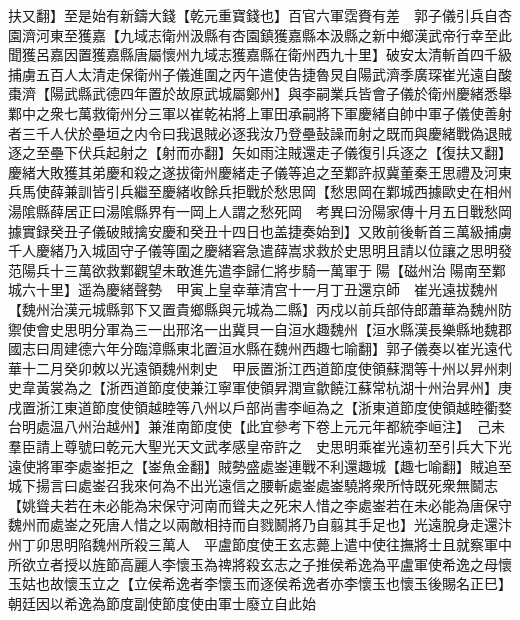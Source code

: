 扶又翻】至是始有新鑄大錢【乾元重寶錢也】百官六軍霑賚有差　郭子儀引兵自杏園濟河東至獲嘉【九域志衛州汲縣有杏園鎮獲嘉縣本汲縣之新中鄉漢武帝行幸至此聞獲呂嘉因置獲嘉縣唐屬懷州九域志獲嘉縣在衛州西九十里】破安太清斬首四千級捕虜五百人太清走保衛州子儀進圍之丙午遣使告捷魯炅自陽武濟季廣琛崔光遠自酸棗濟【陽武縣武德四年置於故原武城屬鄭州】與李嗣業兵皆會子儀於衛州慶緒悉舉鄴中之衆七萬救衛州分三軍以崔乾祐將上軍田承嗣將下軍慶緒自帥中軍子儀使善射者三千人伏於壘垣之内令曰我退賊必逐我汝乃登壘鼔譟而射之既而與慶緒戰偽退賊逐之至壘下伏兵起射之【射而亦翻】矢如雨注賊還走子儀復引兵逐之【復扶又翻】慶緒大敗獲其弟慶和殺之遂拔衛州慶緒走子儀等追之至鄴許叔冀董秦王思禮及河東兵馬使薛兼訓皆引兵繼至慶緒收餘兵拒戰於愁思岡【愁思岡在鄴城西據歐史在相州湯隂縣薛居正曰湯隂縣界有一岡上人謂之愁死岡　考異曰汾陽家傳十月五日戰愁岡據實録癸丑子儀破賊擒安慶和癸丑十四日也盖捷奏始到】又敗前後斬首三萬級捕虜千人慶緒乃入城固守子儀等圍之慶緒窘急遣薛嵩求救於史思明且請以位讓之思明發范陽兵十三萬欲救鄴觀望未敢進先遣李歸仁將步騎一萬軍于陽【磁州治陽南至鄴城六十里】遥為慶緒聲勢　甲寅上皇幸華清宫十一月丁丑還京師　崔光遠拔魏州【魏州治漢元城縣郭下又置貴鄉縣與元城為二縣】丙戍以前兵部侍郎蕭華為魏州防禦使會史思明分軍為三一出邢洺一出冀貝一自洹水趣魏州【洹水縣漢長樂縣地魏郡國志曰周建德六年分臨漳縣東北置洹水縣在魏州西趣七喻翻】郭子儀奏以崔光遠代華十二月癸卯敇以光遠領魏州刺史　甲辰置浙江西道節度使領蘇潤等十州以昇州刺史韋黃裳為之【浙西道節度使兼江寧軍使領昇潤宣歙饒江蘇常杭湖十州治昇州】庚戌置浙江東道節度使領越睦等八州以戶部尚書李峘為之【浙東道節度使領越睦衢婺台明處温八州治越州】兼淮南節度使【此宜參考下卷上元元年都統李峘注】　己未羣臣請上尊號曰乾元大聖光天文武孝感皇帝許之　史思明乘崔光遠初至引兵大下光遠使將軍李處崟拒之【崟魚金翻】賊勢盛處崟連戰不利還趣城【趣七喻翻】賊追至城下揚言曰處崟召我來何為不出光遠信之腰斬處崟處崟驍將衆所恃既死衆無鬬志【姚聳夫若在未必能為宋保守河南而聳夫之死宋人惜之李處崟若在未必能為唐保守魏州而處崟之死唐人惜之以兩敵相持而自戮鬭將乃自翦其手足也】光遠脫身走還汴州丁卯思明陷魏州所殺三萬人　平盧節度使王玄志薨上遣中使往撫將士且就察軍中所欲立者授以旌節高麗人李懷玉為禆將殺玄志之子推侯希逸為平盧軍使希逸之母懷玉姑也故懷玉立之【立侯希逸者李懷玉而逐侯希逸者亦李懷玉也懷玉後賜名正巳】朝廷因以希逸為節度副使節度使由軍士廢立自此始

